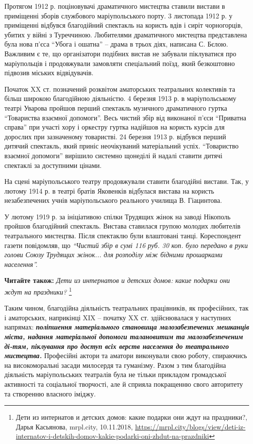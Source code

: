 Протягом 1912 р. поціновувачі драматичного мистецтва ставили вистави в
приміщенні зборів службового маріупольського порту. 3 листопада 1912 р. у
приміщенні відбувся благодійний спектакль на користь вдів і сиріт чорногорців,
убитих у війні з Туреччиною. Любителями драматичного мистецтва представлена
була нова п'єса \enquote{Убога і ошатна} – драма в трьох діях, написана С.
Бєлою.  Важливим є те, що організатори подібних вистав не забували піклуватися
про маріупольців і продовжували замовляти спеціальний поїзд, який безкоштовно
підвозив міських відвідувачів.

Початок XX ст. позначений розквітом аматорських театральних колективів та більш
широкою благодійною діяльністю. 4 березня 1913 р. в маріупольському театрі
Уварова пройшов перший спектакль музичного драматичного гуртка
\enquote{Товариства взаємної допомоги}. Весь чистий збір від виконаної п’єси
\enquote{Приватна справа} при участі хору і оркестру гуртка надійшов на користь
курсів для дорослих при зазначеному товаристві. 24 березня 1913 р. відбувся
перший дитячий спектакль, який приніс неочікуваний матеріальний успіх.
\enquote{Товариство взаємної допомоги} вирішило системно щонеділі й надалі
ставити дитячі спектаклі за доступними цінами.

На сцені маріупольського театру продовжували ставити благодійні вистави. Так, у
лютому 1914 р. в театрі братів Яковенків відбулася вистава на користь
незабезпечених учнів маріупольського реального училища В. Гіацинтова.

У лютому 1919 р. за ініціативою спілки Трудящих жінок на заводі Нікополь
пройшов благодійний спектакль. Вистава ставилася групою молодих любителів
театрального мистецтва. Після спектаклю були влаштовані танці. Кореспондент
газети повідомляв, що \emph{\enquote{Чистий збір в сумі 116 руб. 30 коп. було передано в руки
голови Союзу Трудящих жінок... для розподілу між бідними прошарками населення}.}

\textbf{Читайте також:} \emph{Дети из интернатов и детских домов: какие подарки они ждут на праздники?}%
\footnote{Дети из интернатов и детских домов: какие подарки они ждут на праздники?, Дарья Касьянова, mrpl.city, 10.11.2018, \url{https://mrpl.city/blogs/view/deti-iz-internatov-i-detskih-domov-kakie-podarki-oni-zhdut-na-prazdniki}}

Таким чином, благодійна діяльність театральних працівників, як професійних, так
і аматорських, наприкінці XIX – початку XX ст. здійснювалася у наступних
напрямах: \textbf{\em поліпшення матеріального становища малозабезпечених мешканців міста,
надання матеріальної допомоги талановитим та малозабезпеченим ді\hyp{}тям, піклування
про доступ всіх верств населення до театрального мистецтва.} Професійні актори
та аматори виконували свою роботу, спираючись на високоморальні засади
милосердя та гуманізму. Разом з тим благодійна діяльність маріупольських
театралів була не тільки прикладом громадської активності та соціальної
творчості, але й сприяла покращенню свого авторитету та створенню власного
іміджу.


\clearpage
